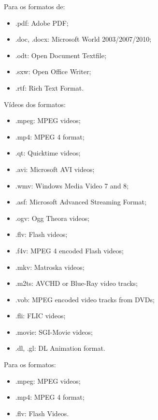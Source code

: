 Para os formatos de:
\begin{itemize}
    \item{.pdf: Adobe PDF;}
    \item{.doc, .docx: Microsoft World 2003/2007/2010;}
    \item{.odt: Open Document Textfile;}
    \item{.sxw: Open Office Writer;}
    \item{.rtf: Rich Text Format.}
\end{itemize}


Vídeos dos formatos:
\begin{itemize}
    \item{.mpeg: MPEG videos;}
    \item{.mp4: MPEG 4 format;}
    \item{.qt: Quicktime videos;}
    \item{.avi: Microsoft AVI videos;}
    \item{.wmv: Windows Media Video 7 and 8;}
    \item{.asf: Microsoft Advanced Streaming Format;}
    \item{.ogv: Ogg Theora videos;}
    \item{.flv: Flash videos;}
    \item{.f4v: MPEG 4 encoded Flash videos;}
    \item{.mkv: Matroska videos;}
    \item{.m2ts: AVCHD or Blue-Ray video tracks;}
    \item{.vob: MPEG encoded video tracks from DVDs;}
    \item{.fli: FLIC videos;}
    \item{.movie: SGI-Movie videos;}
    \item{.dl, .gl: DL Animation format.}
\end{itemize}


Para os formatos:
\begin{itemize}
    \item{.mpeg: MPEG videos;}
    \item{.mp4: MPEG 4 format;}
    \item{.flv: Flash Videos.}
\end{itemize}


